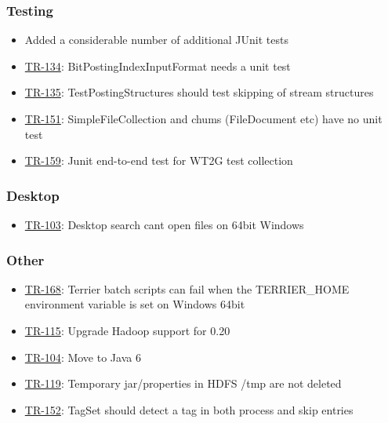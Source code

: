 \subsubsection{Testing}\label{testing-1}

\begin{itemize}
\tightlist
\item
  Added a considerable number of additional JUnit tests
\item
  \href{http://terrier.org/issues/browse/TR-134}{TR-134}:
  BitPostingIndexInputFormat needs a unit test
\item
  \href{http://terrier.org/issues/browse/TR-135}{TR-135}:
  TestPostingStructures should test skipping of stream structures
\item
  \href{http://terrier.org/issues/browse/TR-151}{TR-151}:
  SimpleFileCollection and chums (FileDocument etc) have no unit test
\item
  \href{http://terrier.org/issues/browse/TR-159}{TR-159}: Junit
  end-to-end test for WT2G test collection
\end{itemize}

\subsubsection{Desktop}\label{desktop}

\begin{itemize}
\tightlist
\item
  \href{http://terrier.org/issues/browse/TR-103}{TR-103}: Desktop search
  cant open files on 64bit Windows
\end{itemize}

\subsubsection{Other}\label{other-3}

\begin{itemize}
\tightlist
\item
  \href{http://terrier.org/issues/browse/TR-168}{TR-168}: Terrier batch
  scripts can fail when the TERRIER\_HOME environment variable is set on
  Windows 64bit
\item
  \href{http://terrier.org/issues/browse/TR-115}{TR-115}: Upgrade Hadoop
  support for 0.20
\item
  \href{http://terrier.org/issues/browse/TR-115}{TR-104}: Move to Java 6
\item
  \href{http://terrier.org/issues/browse/TR-119}{TR-119}: Temporary
  jar/properties in HDFS /tmp are not deleted
\item
  \href{http://terrier.org/issues/browse/TR-152}{TR-152}: TagSet should
  detect a tag in both process and skip entries
\end{itemize}

